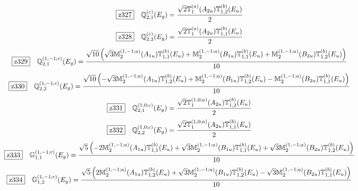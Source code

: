 \documentclass[fleqn,10pt,landscape]{jsarticle}
\begin{document}
\begin{dmath*}
\hspace*{3mm}\fbox{z327}\quad \mathbb{Q}_{2,1}^{(c)}(E_{g})=\frac{\sqrt{2} \mathbb{T}_{1}^{(a)}(A_{2u}) \mathbb{T}_{1,2}^{(b)}(E_{u})}{2}
\end{dmath*}
\begin{dmath*}
\hspace*{3mm}\fbox{z328}\quad \mathbb{Q}_{2,2}^{(c)}(E_{g})=\frac{\sqrt{2} \mathbb{T}_{1}^{(a)}(A_{2u}) \mathbb{T}_{1,1}^{(b)}(E_{u})}{2}
\end{dmath*}
\begin{dmath*}
\hspace*{3mm}\fbox{z329}\quad \mathbb{Q}_{2,1}^{(1,-1;c)}(E_{g})=\frac{\sqrt{10} \left(\sqrt{3} \mathbb{M}_{2}^{(1,-1;a)}(A_{1u}) \mathbb{T}_{1,1}^{(b)}(E_{u}) + \mathbb{M}_{2}^{(1,-1;a)}(B_{1u}) \mathbb{T}_{1,1}^{(b)}(E_{u}) + \mathbb{M}_{2}^{(1,-1;a)}(B_{2u}) \mathbb{T}_{1,2}^{(b)}(E_{u})\right)}{10}
\end{dmath*}
\begin{dmath*}
\hspace*{3mm}\fbox{z330}\quad \mathbb{Q}_{2,2}^{(1,-1;c)}(E_{g})=\frac{\sqrt{10} \left(- \sqrt{3} \mathbb{M}_{2}^{(1,-1;a)}(A_{1u}) \mathbb{T}_{1,2}^{(b)}(E_{u}) + \mathbb{M}_{2}^{(1,-1;a)}(B_{1u}) \mathbb{T}_{1,2}^{(b)}(E_{u}) - \mathbb{M}_{2}^{(1,-1;a)}(B_{2u}) \mathbb{T}_{1,1}^{(b)}(E_{u})\right)}{10}
\end{dmath*}
\begin{dmath*}
\hspace*{3mm}\fbox{z331}\quad \mathbb{Q}_{2,1}^{(1,0;c)}(E_{g})=\frac{\sqrt{2} \mathbb{T}_{1}^{(1,0;a)}(A_{2u}) \mathbb{T}_{1,2}^{(b)}(E_{u})}{2}
\end{dmath*}
\begin{dmath*}
\hspace*{3mm}\fbox{z332}\quad \mathbb{Q}_{2,2}^{(1,0;c)}(E_{g})=\frac{\sqrt{2} \mathbb{T}_{1}^{(1,0;a)}(A_{2u}) \mathbb{T}_{1,1}^{(b)}(E_{u})}{2}
\end{dmath*}
\begin{dmath*}
\hspace*{3mm}\fbox{z333}\quad \mathbb{G}_{1,1}^{(1,-1;c)}(E_{g})=\frac{\sqrt{5} \left(- 2 \mathbb{M}_{2}^{(1,-1;a)}(A_{1u}) \mathbb{T}_{1,1}^{(b)}(E_{u}) + \sqrt{3} \mathbb{M}_{2}^{(1,-1;a)}(B_{1u}) \mathbb{T}_{1,1}^{(b)}(E_{u}) + \sqrt{3} \mathbb{M}_{2}^{(1,-1;a)}(B_{2u}) \mathbb{T}_{1,2}^{(b)}(E_{u})\right)}{10}
\end{dmath*}
\begin{dmath*}
\hspace*{3mm}\fbox{z334}\quad \mathbb{G}_{1,2}^{(1,-1;c)}(E_{g})=\frac{\sqrt{5} \left(2 \mathbb{M}_{2}^{(1,-1;a)}(A_{1u}) \mathbb{T}_{1,2}^{(b)}(E_{u}) + \sqrt{3} \mathbb{M}_{2}^{(1,-1;a)}(B_{1u}) \mathbb{T}_{1,2}^{(b)}(E_{u}) - \sqrt{3} \mathbb{M}_{2}^{(1,-1;a)}(B_{2u}) \mathbb{T}_{1,1}^{(b)}(E_{u})\right)}{10}
\end{dmath*}
\end{document}

